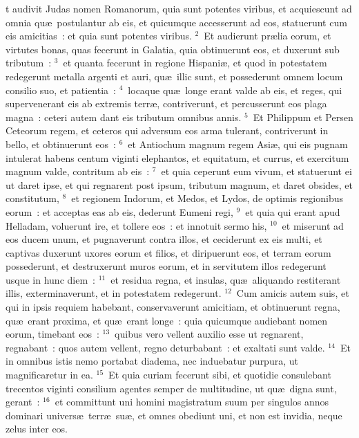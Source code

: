 \bchapter
{}t audivit Judas nomen Romanorum, quia sunt potentes viribus, et acquiescunt ad omnia qu\ae\ postulantur ab eis, et quicumque accesserunt ad eos, statuerunt cum eis amicitias~: et quia sunt potentes viribus.
${}^{2}$~Et audierunt pr\ae lia eorum, et virtutes bonas, quas fecerunt in Galatia, quia obtinuerunt eos, et duxerunt sub tributum~:
${}^{3}$~et quanta fecerunt in regione Hispani\ae , et quod in potestatem redegerunt metalla argenti et auri, qu\ae\ illic sunt, et possederunt omnem locum consilio suo, et patientia~:
${}^{4}$~locaque qu\ae\ longe erant valde ab eis, et reges, qui supervenerant eis ab extremis terr\ae , contriverunt, et percusserunt eos plaga magna~: ceteri autem dant eis tributum omnibus annis.
${}^{5}$~Et Philippum et Persen Ceteorum regem, et ceteros qui adversum eos arma tulerant, contriverunt in bello, et obtinuerunt eos~:
${}^{6}$~et Antiochum magnum regem Asi\ae , qui eis pugnam intulerat habens centum viginti elephantos, et equitatum, et currus, et exercitum magnum valde, contritum ab eis~:
${}^{7}$~et quia ceperunt eum vivum, et statuerunt ei ut daret ipse, et qui regnarent post ipsum, tributum magnum, et daret obsides, et constitutum,
${}^{8}$~et regionem Indorum, et Medos, et Lydos, de optimis regionibus eorum~: et acceptas eas ab eis, dederunt Eumeni regi,
${}^{9}$~et quia qui erant apud Helladam, voluerunt ire, et tollere eos~: et innotuit sermo his,
${}^{10}$~et miserunt ad eos ducem unum, et pugnaverunt contra illos, et ceciderunt ex eis multi, et captivas duxerunt uxores eorum et filios, et diripuerunt eos, et terram eorum possederunt, et destruxerunt muros eorum, et in servitutem illos redegerunt usque in hunc diem~:
${}^{11}$~et residua regna, et insulas, qu\ae\ aliquando restiterant illis, exterminaverunt, et in potestatem redegerunt.
${}^{12}$~Cum amicis autem suis, et qui in ipsis requiem habebant, conservaverunt amicitiam, et obtinuerunt regna, qu\ae\ erant proxima, et qu\ae\ erant longe~: quia quicumque audiebant nomen eorum, timebant eos~:
${}^{13}$~quibus vero vellent auxilio esse ut regnarent, regnabant~: quos autem vellent, regno deturbabant~: et exaltati sunt valde.
${}^{14}$~Et in omnibus istis nemo portabat diadema, nec induebatur purpura, ut magnificaretur in ea.
${}^{15}$~Et quia curiam fecerunt sibi, et quotidie consulebant trecentos viginti consilium agentes semper de multitudine, ut qu\ae\ digna sunt, gerant~:
${}^{16}$~et committunt uni homini magistratum suum per singulos annos dominari univers\ae\ terr\ae\ su\ae , et omnes obediunt uni, et non est invidia, neque zelus inter eos.


